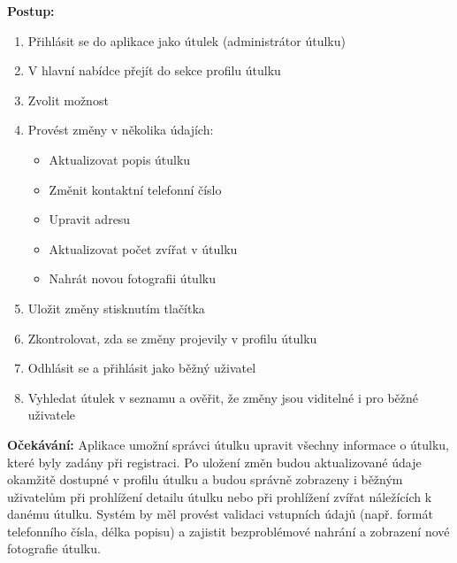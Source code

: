 \documentclass[czech, bp, kiv, he, iso690numb, pdf]{fasthesis}
\begin{document}
    \noindent \textbf{Postup:}
    \begin{enumerate}
        \item Přihlásit se do aplikace jako útulek (administrátor útulku)
        \item V hlavní nabídce přejít do sekce profilu útulku
        \item Zvolit možnost 
        \item Provést změny v několika údajích:
        \begin{itemize}
            \item Aktualizovat popis útulku
            \item Změnit kontaktní telefonní číslo
            \item Upravit adresu
            \item Aktualizovat počet zvířat v útulku
            \item Nahrát novou fotografii útulku
        \end{itemize}
        \item Uložit změny stisknutím tlačítka 
        \item Zkontrolovat, zda se změny projevily v profilu útulku
        \item Odhlásit se a přihlásit jako běžný uživatel
        \item Vyhledat útulek v seznamu a ověřit, že změny jsou viditelné i pro běžné uživatele
    \end{enumerate}

    \noindent \textbf{Očekávání:}
    Aplikace umožní správci útulku upravit všechny informace o útulku, které byly zadány při registraci. Po uložení změn budou aktualizované údaje okamžitě dostupné v profilu útulku a budou správně zobrazeny i běžným uživatelům při prohlížení detailu útulku nebo při prohlížení zvířat náležících k danému útulku. Systém by měl provést validaci vstupních údajů (např. formát telefonního čísla, délka popisu) a zajistit bezproblémové nahrání a zobrazení nové fotografie útulku.\\
\end{document}
